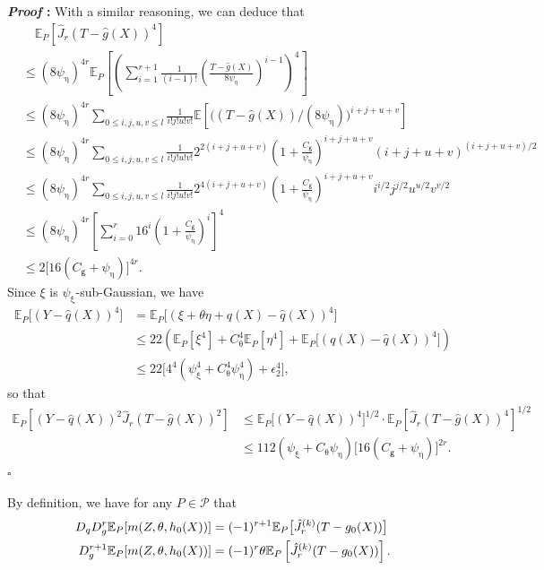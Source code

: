 \documentclass{article}
\def\eps{{\epsilon}}
\def\gP{{\mathcal{P}}}
\newcommand{\E}{\mathbb{E}}
\renewenvironment{proof}{\noindent\textbf{\textit{Proof }:}}{\hfill$\square$}
\begin{document}
\begin{proof}
    With a similar reasoning, we can deduce that
    \begin{align}
        &\quad \E_{P}\left[ \hat{J}_r(T-\hat{g}(X))^4 \right] \nonumber \\
        &\leq (8\psi_{\upeta})^{4r} \E_P\left[ \left(\sum_{i=1}^{r+1}\frac{1}{(i-1)!}\left(\frac{T-\hat{g}(X)}{8\psi_{\upeta}}\right)^{i-1}\right)^4 \right] \nonumber \\
        &\leq (8\psi_{\upeta})^{4r} \sum_{0\leq i,j,u,v \leq l} \frac{1}{i!j!u!v!} \E\left[ \big((T-\hat{g}(X))/(8\psi_{\upeta})\big)^{i+j+u+v} \right] \nonumber \\
        &\leq (8\psi_{\upeta})^{4r} \sum_{0\leq i,j,u,v \leq l} \frac{1}{i!j!u!v!} 2^{2(i+j+u+v)} \left(1+\frac{C_{\mathsf{g}}}{\psi_{\upeta}}\right)^{i+j+u+v} (i+j+u+v)^{(i+j+u+v)/2} \nonumber \\
        &\leq (8\psi_{\upeta})^{4r} \sum_{0\leq i,j,u,v \leq l} \frac{1}{i!j!u!v!} 2^{4(i+j+u+v)} \left(1+\frac{C_{\mathsf{g}}}{\psi_{\upeta}}\right)^{i+j+u+v} i^{i/2}j^{j/2}u^{u/2}v^{v/2} \nonumber \\
        &\leq (8\psi_{\upeta})^{4r} \left[ \sum_{i=0}^{r} 16^i\left(1+\frac{C_{\mathsf{g}}}{\psi_{\upeta}}\right)^i  \right]^4 \nonumber \\
        &\leq 2\big[16(C_{\mathsf{g}}+\psi_{\upeta})\big]^{4r}. \nonumber
    \end{align}
    Since $\xi$ is $\psi_{\upxi}$-sub-Gaussian, we have
    \begin{align}
        \E_P\big[(Y-\hat{q}(X))^4\big] &= \E_P\big[ (\xi+\theta\eta+q(X)-\hat{q}(X))^4\big] \nonumber \\
        &\leq 22 \left( \E_P[\xi^4] + C_{\uptheta}^4 \E_P[\eta^4] + \E_P\big[ (q(X)-\hat{q}(X))^4 \big] \right) \nonumber \\
        &\leq 22 \big[ 4^4(\psi_{\upxi}^4+C_{\uptheta}^4\psi_{\upeta}^4) + \eps_2^4 \big] \nonumber,
    \end{align}
    so that
    \begin{align}
        \E_{P}\left[ (Y-\hat{q}(X))^2\hat{J}_r(T-\hat{g}(X))^2 \right] &\leq \E_P\big[(Y-\hat{q}(X))^4\big]^{1/2}\cdot \E_{P}\left[ \hat{J}_r(T-\hat{g}(X))^4 \right]^{1/2} \nonumber \\
        &\leq 112 (\psi_{\upxi}+C_{\uptheta}\psi_{\upeta})\big[16(C_{\mathsf{g}}+\psi_{\upeta})\big]^{2r}. \nonumber
    \end{align}
\end{proof}

By definition, we have for any $P\in\gP$ that
\begin{equation}
    \notag
    \begin{aligned}
        D_qD_g^r\E_{P}[m(Z,\theta,h_0(X))] &= (-1)^{r+1} \E_{P}\big[\hat{J}_r^{(k)}(T-g_0(X))\big] \\
        D_g^{r+1}\E_{P}[m(Z,\theta,h_0(X))] &= (-1)^{r}\theta \E_{P}\left[ \hat{J}_r^{(k)}(T-g_0(X)) \right].
    \end{aligned}
\end{equation}
\end{document}
